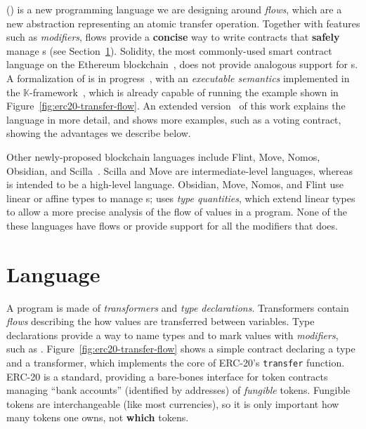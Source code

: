 \documentclass[dvipsnames,runningheads]{llncs}
\begin{document}
\langName (\langNamePronounce) is a new programming language we are designing around \emph{flows}, which are a new abstraction representing an atomic transfer operation.
Together with features such as \emph{modifiers}, flows provide a \textbf{concise} way to write contracts that \textbf{safely} manage \assetTxt{}s (see Section~\ref{sec:lang}).
Solidity, the most commonly-used smart contract language on the Ethereum blockchain~\cite{EthereumForDevs}, does not provide analogous support for \assetTxt{}s.
A formalization of \langName is in progress~\cite{psamatheRepo}, with an \emph{executable semantics} implemented in the $\mathbb{K}$-framework~\cite{rosu-serbanuta-2010-jlap}, which is already capable of running the example shown in Figure~\ref{fig:erc20-transfer-flow}.
An extended version~\cite{oei2020psamathe} of this work explains the language in more detail, and shows more examples, such as a voting contract, showing the advantages we describe below.

Other newly-proposed blockchain languages include Flint, Move, Nomos, Obsidian, and Scilla~\cite{schrans2018flint,blackshear2019move,das2019nomos,coblenz2019obsidian,sergey2019scilla}.
Scilla and Move are intermediate-level languages, whereas \langName is intended to be a high-level language.
Obsidian, Move, Nomos, and Flint use linear or affine types to manage \assetTxt{}s; \langName uses \emph{type quantities}, which extend linear types to allow a more precise analysis of the flow of values in a program.
None of the these languages have flows or provide support for all the modifiers that \langName does.

\section{Language}\label{sec:lang}
A \langName program is made of \emph{transformers} and \emph{type declarations}.
Transformers contain \emph{flows} describing the how values are transferred between variables.
Type declarations provide a way to name types and to mark values with \emph{modifiers}, such as .
Figure~\ref{fig:erc20-transfer-flow} shows a simple contract declaring a type and a transformer, which implements the core of ERC-20's \lstinline{transfer} function.
ERC-20 is a standard, providing a bare-bones interface for token contracts managing ``bank accounts'' (identified by addresses) of \emph{fungible} tokens.
Fungible tokens are interchangeable (like most currencies), so it is only important how many tokens one owns, not \textbf{which} tokens.
\end{document}
